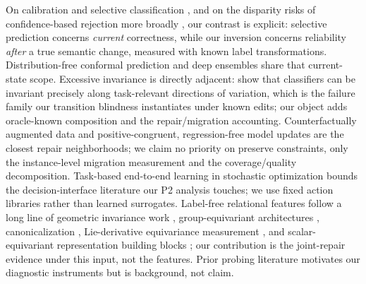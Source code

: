 On calibration and selective classification
\citep{guo2017calibration,geifman2017selective}, and on the disparity
risks of confidence-based rejection more broadly \citep{jones2021selective},
our contrast is explicit: selective prediction concerns \emph{current}
correctness, while our inversion concerns reliability \emph{after} a true
semantic change, measured with known label transformations.
Distribution-free conformal prediction \citep{angelopoulos2023conformal}
and deep ensembles \citep{lakshminarayanan2017simple} share that
current-state scope. Excessive
invariance is directly adjacent: \citet{jacobsen2019excessive} show that
classifiers can be invariant precisely along task-relevant directions of
variation, which is the failure family our transition blindness
instantiates under known edits; our object adds oracle-known composition
and the repair/migration accounting. Counterfactually augmented data
\citep{kaushik2020learning} and positive-congruent, regression-free model
updates \citep{yan2021positive} are the closest repair neighborhoods; we
claim no priority on preserve constraints, only the instance-level
migration measurement and the coverage/quality decomposition. Task-based
end-to-end learning in stochastic optimization \citep{donti2017task}
bounds the decision-interface literature our P2 analysis touches; we use
fixed action libraries rather than learned surrogates. Label-free
relational features follow a long line of geometric invariance work
\citep{lenc2015understanding}, group-equivariant architectures
\citep{cohen2016group}, canonicalization \citep{kaba2023canonicalization},
Lie-derivative equivariance measurement \citep{gruver2022lie}, and
scalar-equivariant representation
building blocks \citep{villar2021scalars}; our contribution is the
joint-repair evidence under this input, not the features. Prior probing
literature \citep{belinkov2022probing} motivates our diagnostic
instruments but is background, not claim.
